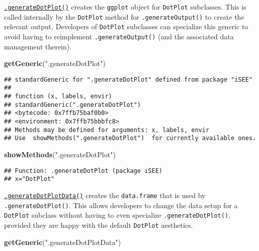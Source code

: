 \documentclass[
]{book}
\newenvironment{Shaded}{\begin{snugshade}}{\end{snugshade}}
\newcommand{\KeywordTok}[1]{\textcolor[rgb]{0.13,0.29,0.53}{\textbf{#1}}}
\newcommand{\NormalTok}[1]{#1}
\newcommand{\StringTok}[1]{\textcolor[rgb]{0.31,0.60,0.02}{#1}}
\begin{document}
\href{https://isee.github.io/iSEE/reference/plot-generics.html}{\texttt{.generateDotPlot()}} creates the \texttt{ggplot} object for \texttt{DotPlot} subclasses.
This is called internally by the \texttt{DotPlot} method for \texttt{.generateOutput()} to create the relevant output.
Developers of \texttt{DotPlot} subclasses can specialize this generic to avoid having to reimplement \texttt{.generateOutput()} (and the associated data management therein).

\begin{Shaded}
\begin{Highlighting}[]
\KeywordTok{getGeneric}\NormalTok{(}\StringTok{".generateDotPlot"}\NormalTok{)}
\end{Highlighting}
\end{Shaded}

\begin{verbatim}
## standardGeneric for ".generateDotPlot" defined from package "iSEE"
## 
## function (x, labels, envir) 
## standardGeneric(".generateDotPlot")
## <bytecode: 0x7ffb75baf0b0>
## <environment: 0x7ffb75bbbfc8>
## Methods may be defined for arguments: x, labels, envir
## Use  showMethods(".generateDotPlot")  for currently available ones.
\end{verbatim}

\begin{Shaded}
\begin{Highlighting}[]
\KeywordTok{showMethods}\NormalTok{(}\StringTok{".generateDotPlot"}\NormalTok{)}
\end{Highlighting}
\end{Shaded}

\begin{verbatim}
## Function: .generateDotPlot (package iSEE)
## x="DotPlot"
\end{verbatim}

\href{https://isee.github.io/iSEE/reference/plot-generics.html}{\texttt{.generateDotPlotData()}} creates the \texttt{data.frame} that is used by \texttt{.generateDotPlot()}.
This allows developers to change the data setup for a \texttt{DotPlot} subclass without having to even specialize \texttt{.generateDotPlot()}, provided they are happy with the default \texttt{DotPlot} aesthetics.

\begin{Shaded}
\begin{Highlighting}[]
\KeywordTok{getGeneric}\NormalTok{(}\StringTok{".generateDotPlotData"}\NormalTok{)}
\end{Highlighting}
\end{Shaded}
\end{document}
